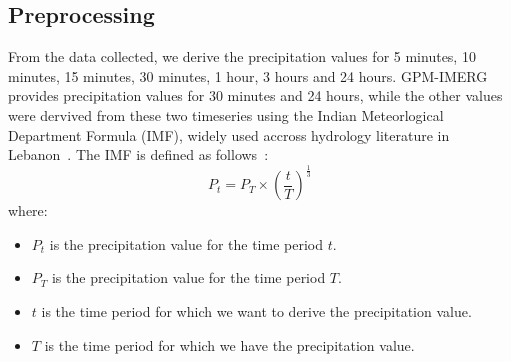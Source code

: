 \subsection{Preprocessing}
From the data collected, we derive the precipitation values for 5 minutes, 10 minutes, 15 minutes, 30 minutes, 1 hour, 3 hours and 24 hours. GPM-IMERG provides precipitation values for 30 minutes and 24 hours, while the other values were dervived from these two timeseries using the Indian Meteorlogical Department Formula (IMF), widely used accross hydrology literature in Lebanon~\cite{}.%
The IMF is defined as follows~\cite{}:
\[P_{t} = P_{T} \times {\left(\frac{t}{T}\right)}^{\frac{1}{3}}\]
where:
\begin{itemize}
  \item $P_{t}$ is the precipitation value for the time period $t$.
  \item $P_{T}$ is the precipitation value for the time period $T$.
  \item $t$ is the time period for which we want to derive the precipitation value.
  \item $T$ is the time period for which we have the precipitation value.
\end{itemize}